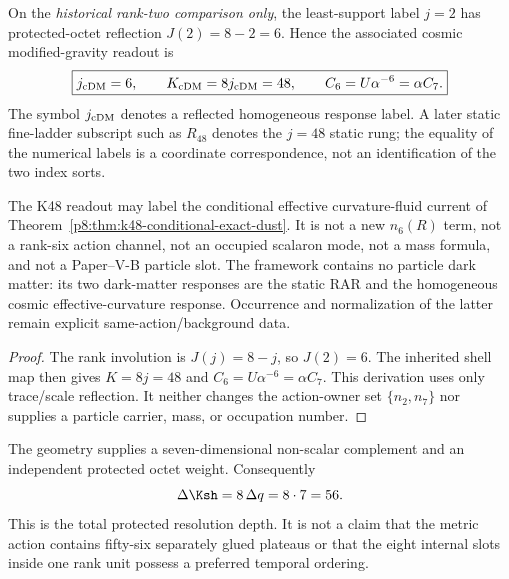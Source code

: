 \documentclass[12pt,a4paper]{article}
\begin{document}
\begin{theorem}
\label{p8:thm:cosmological-dm-depth-firewall}
On the \emph{historical rank-two comparison only}, the least-support label \(j=2\) has protected-octet reflection
\(J(2)=8-2=6\).  Hence the associated cosmic modified-gravity readout is
\begin{equation}
\label{p8:eq:cosmological-dm-depth}
 \boxed{
 j_{\rm cDM}=6,\qquad
 K_{\rm cDM}=8j_{\rm cDM}=48,\qquad
 C_6=U\alpha^{-6}=\alpha C_7.}
\end{equation}
The symbol \(j_{\rm cDM}\) denotes a reflected homogeneous response label.  A later static
fine-ladder subscript such as \(R_{48}\) denotes the \(j=48\) static rung;
the equality of the numerical labels is a coordinate correspondence, not an
identification of the two index sorts.

The K48 readout may label the conditional effective curvature-fluid current
of Theorem~\ref{p8:thm:k48-conditional-exact-dust}.  It is not a new
\(n_6(R)\) term, not a rank-six action channel, not an occupied scalaron mode,
not a mass formula, and not a Paper--V-B particle slot.  The framework contains
no particle dark matter: its two dark-matter responses are the static RAR and
the homogeneous cosmic effective-curvature response.  Occurrence and
normalization of the latter remain explicit same-action/background data.
\end{theorem}

\begin{proof}
The rank involution is \(J(j)=8-j\), so \(J(2)=6\).  The inherited shell map
then gives \(K=8j=48\) and \(C_6=U\alpha^{-6}=\alpha C_7\).  This derivation
uses only trace/scale reflection.  It neither changes the action-owner set
\(\{n_2,n_7\}\) nor supplies a particle carrier, mass, or occupation number.
\end{proof}

\begin{remark}
\label{p8:rem:71456}
The geometry supplies a seven-dimensional non-scalar complement and an
independent protected octet weight.  Consequently
\begin{equation}
 \Delta\Ksh=8\,\Delta q=8\cdot7=56.
\end{equation}
This is the total protected resolution depth.  It is not a claim that the
metric action contains fifty-six separately glued plateaus or that the eight
internal slots inside one rank unit possess a preferred temporal ordering.
\end{remark}
\end{document}
